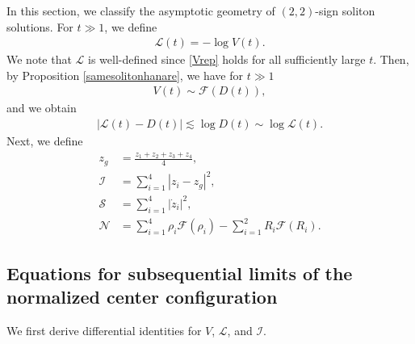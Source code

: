 \documentclass[reqno]{amsart}
\theoremstyle{plain}
\theoremstyle{definition}
\numberwithin{equation}{section}
\begin{document}
In this section, we classify the asymptotic geometry of $(2,2)$-sign soliton solutions. For $t\gg 1$, we define
\begin{align}\label{Ldef}
\mathcal{L}(t)=-\log{V(t)}.
\end{align}
We note that $\mathcal{L}$ is well-defined since \eqref{Vrep} holds for all sufficiently large $t$. Then, by Proposition \ref{samesolitonhanare}, we have for $t\gg 1$
\begin{align}\label{VsimmathcalF}
V(t)\sim \mathcal{F}(D(t)),
\end{align}
and we obtain
\begin{align}\label{mathcalLsim}
\left|\mathcal{L}(t)-D(t)\right|\lesssim \log{D(t)}\sim \log{\mathcal{L}(t)}.
\end{align}
Next, we define 
\begin{align}
z_g&=\frac{z_1+z_2+z_3+z_4}{4}, \label{jushindef}
\\
\mathcal{I}&=\sum_{i=1}^4\left|z_i-z_g\right|^2, \label{mathcalI}
\\
\mathcal{S}&=\sum_{i=1}^4\left|\dot{z}_i\right|^2\label{mathcalS},
\\
\mathcal{N}&=\sum_{i=1}^4\rho_i\mathcal{F}(\rho_i)-\sum_{i=1}^2R_i\mathcal{F}(R_i).\label{mathcalN}
\end{align}

\subsection{Equations for subsequential limits of the normalized center configuration}

We first derive differential identities for $V$, $\mathcal{L}$, and $\mathcal{I}$.
\end{document}
